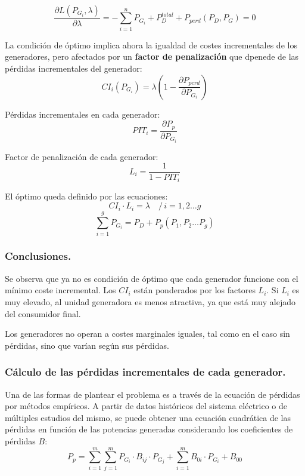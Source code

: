 				\[\dfrac{\partial L(P_{G_i},\lambda)}{\partial \lambda} = -\sum_{i=1}^{n} P_{G_i} + P_D^{total} + P_{perd}(P_D, P_G) = 0\]
				
				
				La condición de óptimo implica ahora la igualdad de costes incrementales de los generadores, pero afectados por un \textbf{factor de penalización} que dpenede de las pérdidas incrementales del generador:
				\[CI_i(P_{G_i}) = \lambda\left(1-\dfrac{\partial P_{perd}}{\partial P_{G_i}}\right)\]
				
				
				
				
				Pérdidas incrementales en cada generador:
				\[PIT_i = \dfrac{\partial P_p}{\partial P_{G_i}}\]
				
				
				Factor de penalización de cada generador:
				\[L_i = \dfrac{1}{1-PIT_i}\]
				
				
				El óptimo queda definido por las ecuaciones:
				\[CI_i\cdot L_i = \lambda \quad /\,i = 1,2\dots g\]
				\[\sum_{i=1}^{g} P_{G_i} = P_D + P_p(P_1,P_2\dots P_g)\]
				
				
			\subsubsection{Conclusiones.}
				Se observa que ya no es condición de óptimo que cada generador funcione con el mínimo coste
				incremental. Los $CI_i$ están ponderados por los factores $L_i$. Si $L_i$ es muy elevado, al unidad generadora es menos atractiva, ya que está muy alejado del consumidor final.
				
				
				
				Los generadores no operan a costes marginales iguales, tal como en el caso sin pérdidas, sino que
				varían según sus pérdidas.
				
			\subsubsection{Cálculo de las pérdidas incrementales de cada generador.}
				Una de las formas de plantear el problema es a través de la ecuación de pérdidas por métodos empíricos. A partir de datos históricos del sistema eléctrico o de múltiples estudios del mismo, se puede obtener una ecuación cuadrática de las pérdidas en función de las potencias generadas considerando los coeficientes de pérdidas $B$:
				\[P_p = \sum_{i=1}^{m}\sum_{j=1}^{m} P_{G_i}\cdot B_{ij} \cdot P_{G_j} + \sum_{i=1}^{m} B_{0i} \cdot P_{G_i} + B_{00}\]
				
